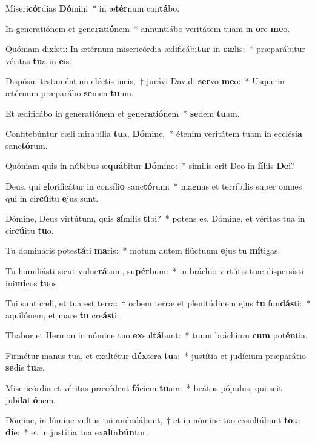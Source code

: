 \item Miseri\textbf{cór}dias \textbf{Dó}mini~* in æ\textbf{tér}num can\textbf{tá}bo.
\item In generatiónem et gene\textbf{ra}ti\textbf{ó}\-nem~* annuntiábo veritátem tuam in \textbf{o}re \textbf{me}o.
\item Quóniam dixísti: In ætérnum misericórdia ædificábi\textbf{tur} in \textbf{cæ}lis:~* præparábitur véritas \textbf{tu}a in \textbf{e}is.
\item Dispósui testaméntum eléctis meis,~† jurávi David, \textbf{ser}vo \textbf{me}o:~* Usque in ætérnum præparábo \textbf{se}men \textbf{tu}um.
\item Et ædificábo in generatiónem et gene\textbf{ra}ti\textbf{ó}nem~* \textbf{se}dem \textbf{tu}am.
\item Confitebúntur cæli mirabília \textbf{tu}a, \textbf{Dó}mine,~* étenim veritátem tuam in ecclési\textbf{a} sanc\textbf{tó}rum.
\item Quóniam quis in núbibus æ\textbf{quá}bitur \textbf{Dó}mino:~* símilis erit Deo in \textbf{fí}liis \textbf{De}i?
\item Deus, qui glorificátur in consíli\textbf{o} sanc\textbf{tó}rum:~* magnus et terríbilis super omnes qui in cir\textbf{cú}itu \textbf{e}jus sunt.
\item Dómine, Deus virtútum, quis \textbf{sí}milis \textbf{ti}bi?~* potens es, Dómine, et véritas tua in cir\textbf{cú}itu \textbf{tu}o.
\item Tu domináris potes\textbf{tá}ti \textbf{ma}ris:~* motum autem flúctuum \textbf{e}jus tu \textbf{mí}tigas.
\item Tu humiliásti sicut vulne\textbf{rá}\-tum, su\textbf{pér}bum:~* in bráchio virtútis tuæ dispersísti ini\textbf{mí}cos \textbf{tu}os.
\item Tui sunt cæli, et tua est terra:~† orbem terræ et plenitúdinem ejus \textbf{tu} fun\textbf{dás}ti:~* aquilónem, et mare \textbf{tu} cre\textbf{ás}ti.
\item Thabor et Hermon in nómine tuo \textbf{ex}sul\textbf{tá}bunt:~* tuum bráchium \textbf{cum} pot\textbf{én}tia.
\item Firmétur manus tua, et exaltétur \textbf{déx}tera \textbf{tu}a:~* justítia et judícium præparátio \textbf{se}dis \textbf{tu}æ.
\item Misericórdia et véritas præcédent \textbf{fá}ciem \textbf{tu}am:~* beátus pópulus, qui scit jubi\textbf{la}ti\textbf{ó}nem.
\item Dómine, in lúmine vultus tui ambulábunt,~† et in nómine tuo exsultábunt \textbf{to}ta \textbf{di}e:~* et in justítia tua ex\textbf{al}ta\textbf{bún}tur.
